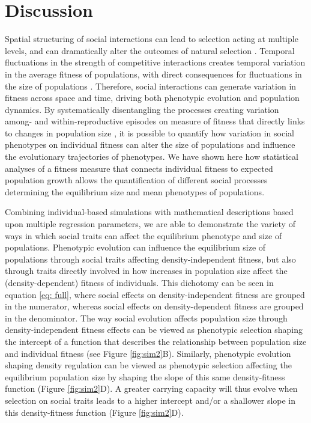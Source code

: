 \documentclass{article}
\begin{document}
\section{Discussion}
Spatial structuring of social interactions can lead to selection acting at multiple levels, and can dramatically alter the outcomes of natural selection \citep{Okasha2004, frank1998foundations, Wolf1999SocialSelection}. Temporal fluctuations in the strength of competitive interactions creates temporal variation in the average fitness of populations, with direct consequences for fluctuations in the size of populations \citep{Gilpin1973a}. Therefore, social interactions can generate variation in fitness across space and time, driving both phenotypic evolution and population dynamics. By systematically disentangling the processes creating variation among- and within-reproductive episodes on measure of fitness that directly links to changes in population size \citep{Saether2015}, it is possible to quantify how variation in social phenotypes on individual fitness can alter the size of populations and influence the evolutionary trajectories of phenotypes. We have shown here how statistical analyses of a fitness measure that connects individual fitness to expected population growth allows the quantification of different social processes determining the equilibrium size and mean phenotypes of populations.

Combining individual-based simulations with mathematical descriptions based upon multiple regression parameters, we are able to demonstrate the variety of ways in which social traits can affect the equilibrium phenotype and size of populations. Phenotypic evolution can influence the equilibrium size of populations through social traits affecting density-independent fitness, but also through traits directly involved in how increases in population size affect the (density-dependent) fitness of individuals. This dichotomy can be seen in equation \ref{eq: full}, where social effects on density-independent fitness are grouped in the numerator, whereas social effects on density-dependent fitness are grouped in the denominator. The way social evolution affects population size through density-independent fitness effects can be viewed as phenotypic selection shaping the intercept of a function that describes the relationship between population size and individual fitness (see Figure \ref{fig:sim2}B). Similarly, phenotypic evolution shaping density regulation can be viewed as phenotypic selection affecting the equilibrium population size by shaping the slope of this same density-fitness function (Figure \ref{fig:sim2}D). A greater carrying capacity will thus evolve when selection on social traits leads to a higher intercept and/or a shallower slope in this density-fitness function (Figure \ref{fig:sim2}D). 
\end{document}
